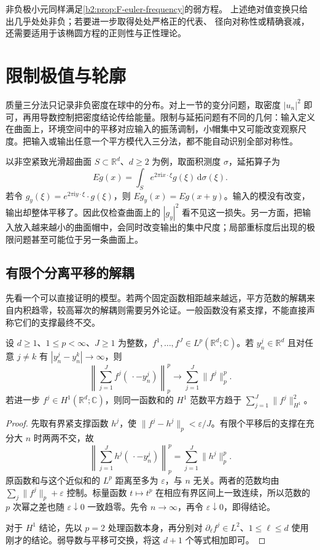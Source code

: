 非负极小元同样满足\cref{b2:prop:F-euler-frequency}的弱方程。
上述绝对值变换只给出几乎处处非负；若要进一步取得处处严格正的代表、
径向对称性或精确衰减，还需要适用于该椭圆方程的正则性与正性理论。

\section{限制极值与轮廓}
\label{b2:sec:app-F-6}

质量三分法只记录非负密度在球中的分布。对上一节的变分问题，取密度 \(|u_n|^2\) 即可，再用导数控制把密度结论传给能量。限制与延拓问题有不同的几何：输入定义在曲面上，环境空间中的平移对应输入的振荡调制，小帽集中又可能改变观察尺度。把输入或输出任意一个平方模代入三分法，都不能自动识别全部对称性。

\ProseParagraphBreak

以非空紧致光滑超曲面 \(S\subset\mathbb R^d\)、\(d\ge2\) 为例，取面积测度 \(\sigma\)，延拓算子为
\[
 Eg(x)=\int_S e^{2\pi\mathrm i x\cdot\xi}g(\xi)\,\mathrm d\sigma(\xi).
\]
若令 \(g_y(\xi)=e^{2\pi\mathrm i y\cdot\xi}\cdot g(\xi)\)，则 \(Eg_y(x)=Eg(x+y)\)。输入的模没有改变，输出却整体平移了。因此仅检查曲面上的 \(|g_y|^2\) 看不见这一损失。另一方面，把输入放入越来越小的曲面帽中，会同时改变输出的集中尺度；局部重标度后出现的极限问题甚至可能位于另一条曲面上。

\subsection{有限个分离平移的解耦}
\label{b2:subsec:F-separated-translates}

先看一个可以直接证明的模型。若两个固定函数相距越来越远，平方范数的解耦来自内积趋零，较高幂次的解耦则需要另外论证。一般函数没有紧支撑，不能直接声称它们的支撑最终不交。

\begin{lemma}[分离平移的幂次解耦]
\label{b2:lem:F-translates-decoupling}
设 \(d\ge1\)、\(1\le p<\infty\)、\(J\ge1\) 为整数，\(f^1,\ldots,f^J\in L^p(\mathbb R^d;\mathbb C)\)。若 \(y_n^j\in\mathbb R^d\) 且对任意 \(j\ne k\) 有 \(|y_n^j-y_n^k|\to\infty\)，则
\[
 \left\|\sum_{j=1}^J f^j(\,\cdot-y_n^j)\right\|_p^p
 \longrightarrow\sum_{j=1}^J\|f^j\|_p^p.
\]
若进一步 \(f^j\in H^1(\mathbb R^d;\mathbb C)\)，则同一函数和的 \(H^1\) 范数平方趋于 \(\sum_{j=1}^J\|f^j\|_{H^1}^2\)。
\end{lemma}
\begin{proof}
先取有界紧支撑函数 \(h^j\)，使 \(\|f^j-h^j\|_p<\varepsilon/J\)。有限个平移后的支撑在充分大 \(n\) 时两两不交，故
\[
 \left\|\sum_{j=1}^J h^j(\,\cdot-y_n^j)\right\|_p^p
 =\sum_{j=1}^J\|h^j\|_p^p.
\]
原函数和与这个近似和的 \(L^p\) 距离至多为 \(\varepsilon\)，与 \(n\) 无关。两者的范数均由 \(\sum_j\|f^j\|_p+\varepsilon\) 控制。标量函数 \(t\mapsto t^p\) 在相应有界区间上一致连续，所以范数的 \(p\) 次幂之差也随 \(\varepsilon\downarrow0\) 一致趋零。先令 \(n\to\infty\)，再令 \(\varepsilon\downarrow0\)，即得结论。

对于 \(H^1\) 结论，先以 \(p=2\) 处理函数本身，再分别对 \(\partial_\ell f^j\in L^2\)、\(1\le\ell\le d\) 使用刚才的结论。弱导数与平移可交换，将这 \(d+1\) 个等式相加即可。
\end{proof}

